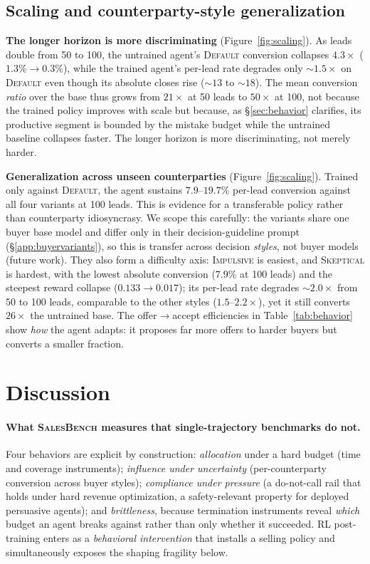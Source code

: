 \documentclass{article} %
\newcommand{\salesbench}{\textsc{SalesBench}}
\begin{document}
\subsection{Scaling and counterparty-style generalization}
\label{sec:scaling}
\textbf{The longer horizon is more discriminating} (Figure~\ref{fig:scaling}). As leads double from 50 to 100, the
untrained agent's \textsc{Default} conversion collapses $4.3\times$ ($1.3\%\rightarrow0.3\%$), while the trained agent's
per-lead rate degrades only ${\sim}1.5\times$ on \textsc{Default} even though its absolute closes rise (${\sim}13$ to
${\sim}18$). The mean conversion \emph{ratio} over the base thus grows from $21\times$ at 50 leads to $50\times$ at 100,
not because the trained policy improves with scale but because, as \S\ref{sec:behavior} clarifies, its productive
segment is bounded by the mistake budget while the untrained baseline collapses faster. The longer horizon is more
discriminating, not merely harder.

\textbf{Generalization across unseen counterparties} (Figure~\ref{fig:scaling}). Trained only against
\textsc{Default}, the agent sustains $7.9\text{--}19.7\%$ per-lead conversion against all four variants at 100
leads. This is evidence for a transferable policy rather than counterparty idiosyncrasy. We scope this carefully: the variants share one
buyer base model and differ only in their decision-guideline prompt (\S\ref{app:buyervariants}), so this is transfer
across decision \emph{styles}, not buyer models (future work). They also form a difficulty axis: \textsc{Impulsive} is
easiest, and \textsc{Skeptical} is hardest, with the lowest absolute conversion ($7.9\%$ at 100 leads) and the steepest
reward collapse ($0.133\rightarrow0.017$); its per-lead rate degrades ${\sim}2.0\times$ from 50 to 100 leads, comparable
to the other styles ($1.5\text{--}2.2\times$), yet it still converts $26\times$ the untrained base. The
offer$\rightarrow$accept efficiencies in Table~\ref{tab:behavior} show \emph{how} the agent adapts: it proposes far more
offers to harder buyers but converts a smaller fraction.

\section{Discussion}
\label{sec:discussion}

\paragraph{What \salesbench{} measures that single-trajectory benchmarks do not.} Four behaviors are explicit by
construction: \emph{allocation} under a hard budget (time and coverage instruments); \emph{influence under
uncertainty} (per-counterparty conversion across buyer styles); \emph{compliance under pressure} (a do-not-call rail
that holds under hard revenue optimization, a safety-relevant property for deployed persuasive agents); and
\emph{brittleness}, because termination instruments reveal \emph{which} budget an agent breaks against rather than
only whether it succeeded. RL post-training enters as a \emph{behavioral intervention} that installs a selling policy
and simultaneously exposes the shaping fragility below.
\end{document}

